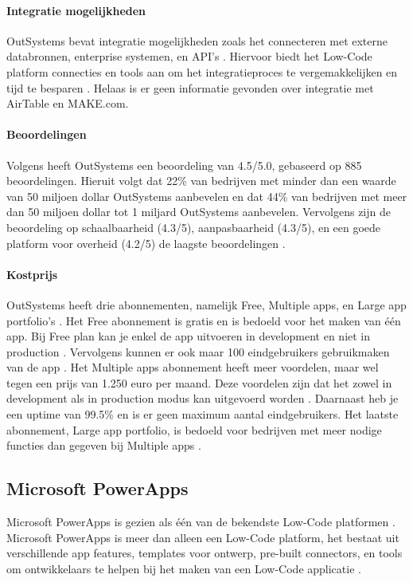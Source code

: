 \paragraph{Integratie mogelijkheden}
OutSystems bevat integratie mogelijkheden zoals het connecteren met externe databronnen, enterprise systemen, en API's \autocite{Payne2023}.
Hiervoor biedt het Low-Code platform connecties en tools aan om het integratieproces te vergemakkelijken en tijd te besparen \autocite{Payne2023}. Helaas
is er geen informatie gevonden over integratie met AirTable en MAKE.com.

\paragraph{Beoordelingen}
Volgens \textcite{Gartner2024} heeft OutSystems een beoordeling van 4.5/5.0, gebaseerd op 885 beoordelingen. 
Hieruit volgt dat 22\% van bedrijven met minder dan een waarde van 50 miljoen dollar OutSystems aanbevelen en dat 44\% van bedrijven met meer dan 50 miljoen dollar tot 1 miljard OutSystems aanbevelen.
Vervolgens zijn de beoordeling op schaalbaarheid (4.3/5), aanpasbaarheid (4.3/5), en een goede platform voor overheid (4.2/5) de laagste beoordelingen \autocite{Gartner2024}.

\paragraph{Kostprijs}
OutSystems heeft drie abonnementen, namelijk Free, Multiple apps, en Large app portfolio's \autocite{OutSystems}. Het Free abonnement is gratis en is bedoeld voor het maken van één app.
Bij Free plan kan je enkel de app uitvoeren in development en niet in production \autocite{OutSystems}. Vervolgens kunnen er ook maar 100 eindgebruikers gebruikmaken van de app \autocite{OutSystems}.
Het Multiple apps abonnement heeft meer voordelen, maar wel tegen een prijs van 1.250 euro per maand. Deze voordelen zijn dat het zowel in development als in production modus kan uitgevoerd worden \autocite{OutSystems}.
Daarnaast heb je een uptime van 99.5\% en is er geen maximum aantal eindgebruikers. Het laatste abonnement, Large app portfolio, is bedoeld voor bedrijven met meer nodige functies dan gegeven bij Multiple apps \autocite{OutSystems}. 
\subsection{Microsoft PowerApps}%
\label{subsec:microsoft-powerapps}
Microsoft PowerApps is gezien als één van de bekendste Low-Code platformen \autocite{Nguyen} \autocite{Gupta2023}.
Microsoft PowerApps is meer dan alleen een Low-Code platform, het bestaat uit verschillende app features, templates voor ontwerp, pre-built connectors, en tools om ontwikkelaars te helpen bij het maken van een Low-Code applicatie \autocite{Nguyen}.

